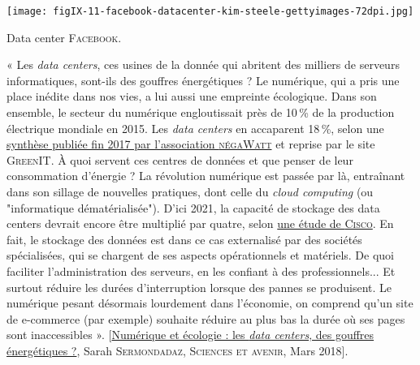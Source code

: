 \begin{marginfigure}
\texttt{[image: figIX-11-facebook-datacenter-kim-steele-gettyimages-72dpi.jpg]}
\caption{\label{fig:IX.11}Data center \textsc{Facebook}.}
\end{marginfigure}


« Les \textit{data centers}, ces usines de la donnée qui abritent des milliers de serveurs informatiques, sont-ils des gouffres énergétiques ? Le numérique, qui a pris une place inédite dans nos vies, a lui aussi une empreinte écologique. Dans son ensemble, le secteur du numérique engloutissait près de 10\,\% de la production électrique mondiale en 2015. Les \textit{data centers} en accaparent 18\,\%, selon une \href{http://decrypterlenergie.org/la-revolution-numerique-fera-t-elle-exploser-nos-consommations-denergie}{synthèse publiée fin 2017 par l'association \textsc{négaWatt}} et reprise par le site \textsc{GreenIT}. À quoi servent ces centres de données et que penser de leur consommation d'énergie ? La révolution numérique est passée par là, entraînant dans son sillage de nouvelles pratiques, dont celle du \textit{cloud computing} (ou "informatique dématérialisée"). D'ici 2021, la capacité de stockage des data centers devrait encore être multiplié par quatre, selon \href{https://www.cisco.com/c/en/us/solutions/executive-perspectives/annual-internet-report/index.html}{une étude de \textsc{Cisco}}. En fait, le stockage des données est dans ce cas externalisé par des sociétés spécialisées, qui se chargent de ses aspects opérationnels et matériels. De quoi faciliter l'administration des serveurs, en les confiant à des professionnels... Et surtout réduire les durées d'interruption lorsque des pannes se produisent. Le numérique pesant désormais lourdement dans l'économie, on comprend qu'un site de e-commerce (par exemple) souhaite réduire au plus bas la durée où ses pages sont inaccessibles ». [\href{https://www.sciencesetavenir.fr/high-tech/informatique/numerique-et-ecologie-les-data-centers-des-gouffres-energetiques_121838}{Numérique et écologie : les \textit{data centers}, des gouffres énergétiques ?}, Sarah \textsc{Sermondadaz}, \textsc{Sciences et avenir}, Mars 2018].


